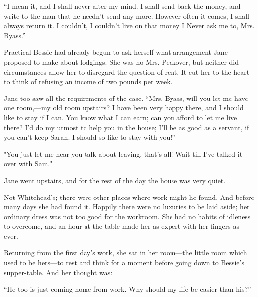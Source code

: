 ``I mean it, and I shall never alter my mind. I shall send back the
money, and write to the man that he needn't send any more. However often
it comes, I shall always return it. I couldn't, I couldn't live on that
money I Never ask me to, Mrs. Byass.''

Practical Bessie had already begun to ask herself what arrangement Jane
proposed to make about lodgings. She was no Mrs. Peckover, but neither
did circumstances allow her to disregard the question of rent. It cut
her to the heart to think of refusing an income of two pounds per week.

Jane too saw all the requirements of the case. ``Mrs. Byass, will you
let me have one room,---my old room upstairs? I have been very happy
there, and I should like to stay if I can. You know what I can earn; can
you afford to let me live there? I'd do my utmost to help you in the
house; I'll be as good as a servant, if you can't keep Sarah. I should
so like to stay with you!''

"You just let me hear you talk about
{\protect\hypertarget{250}{}{}}leaving, that's all! Wait till I've
talked it over with Sam."

Jane went upstairs, and for the rest of the day the house was very
quiet.

Not Whitehead's; there were other places where work might he found. And
before many days she had found it. Happily there were no luxuries to be
laid aside; her ordinary dress was not too good for the workroom. She
had no habits of idleness to overcome, and an hour at the table made her
as expert with her fingers as ever.

Returning from the first day's work, she sat in her room---the little
room which used to be hers---to rest and think for a moment before going
down to Bessie's supper-table. And her thought was:

``He too is just coming home from work. Why should my life be easier
than his?''
